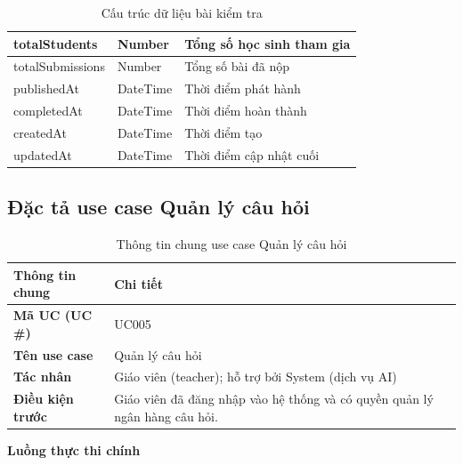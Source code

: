 \begin{table}[H]
{\begin{tabular}{|l|l|p{5cm}|}
\hline
totalStudents & Number & Tổng số học sinh tham gia \\
\hline
totalSubmissions & Number & Tổng số bài đã nộp \\
\hline
publishedAt & DateTime & Thời điểm phát hành \\
\hline
completedAt & DateTime & Thời điểm hoàn thành \\
\hline
createdAt & DateTime & Thời điểm tạo \\
\hline
updatedAt & DateTime & Thời điểm cập nhật cuối \\
\hline
\end{tabular}
}
\caption{Cấu trúc dữ liệu bài kiểm tra}
\end{table}

\subsection{Đặc tả use case Quản lý câu hỏi}
\label{subsection:2.3.5}

\begin{table}[htbp]
\centering
\begin{tabular}{|p{4cm}|p{10cm}|}
\hline
\textbf{Thông tin chung} & \textbf{Chi tiết} \\ \hline
\textbf{Mã UC (UC \#)} & UC005 \\ \hline
\textbf{Tên use case} & Quản lý câu hỏi \\ \hline
\textbf{Tác nhân} & Giáo viên (teacher); hỗ trợ bởi System (dịch vụ AI) \\ \hline
\textbf{Điều kiện trước} & Giáo viên đã đăng nhập vào hệ thống và có quyền quản lý ngân hàng câu hỏi. \\ \hline
\end{tabular}
\caption{Thông tin chung use case Quản lý câu hỏi}
\label{table:2.3.5_info}
\end{table}

\noindent\textbf{Luồng thực thi chính}


